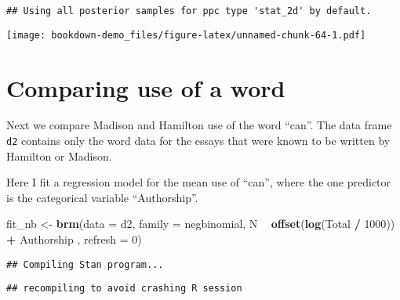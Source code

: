 \documentclass[
]{book}
\newenvironment{Shaded}{\begin{snugshade}}{\end{snugshade}}
\newcommand{\DataTypeTok}[1]{\textcolor[rgb]{0.13,0.29,0.53}{#1}}
\newcommand{\DecValTok}[1]{\textcolor[rgb]{0.00,0.00,0.81}{#1}}
\newcommand{\KeywordTok}[1]{\textcolor[rgb]{0.13,0.29,0.53}{\textbf{#1}}}
\newcommand{\NormalTok}[1]{#1}
\newcommand{\OperatorTok}[1]{\textcolor[rgb]{0.81,0.36,0.00}{\textbf{#1}}}
\newcommand{\StringTok}[1]{\textcolor[rgb]{0.31,0.60,0.02}{#1}}
\begin{document}
\begin{verbatim}
## Using all posterior samples for ppc type 'stat_2d' by default.
\end{verbatim}

\texttt{[image: bookdown-demo\_files/figure-latex/unnamed-chunk-64-1.pdf]}

\hypertarget{comparing-use-of-a-word}{%
\section{Comparing use of a word}\label{comparing-use-of-a-word}}

Next we compare Madison and Hamilton use of the word ``can''. The data frame \texttt{d2} contains only the word data for the essays that were known to be written by Hamilton or Madison.

\begin{Shaded}
\end{Shaded}

Here I fit a regression model for the mean use of ``can'', where the one predictor is the categorical variable ``Authorship''.

\begin{Shaded}
\begin{Highlighting}[]
\NormalTok{fit_nb <-}\StringTok{ }\KeywordTok{brm}\NormalTok{(}\DataTypeTok{data =}\NormalTok{ d2, }\DataTypeTok{family =}\NormalTok{ negbinomial,}
\NormalTok{           N }\OperatorTok{~}\StringTok{ }\KeywordTok{offset}\NormalTok{(}\KeywordTok{log}\NormalTok{(Total }\OperatorTok{/}\StringTok{ }\DecValTok{1000}\NormalTok{)) }\OperatorTok{+}\StringTok{ }
\StringTok{          }\NormalTok{Authorship ,}
           \DataTypeTok{refresh =} \DecValTok{0}\NormalTok{)}
\end{Highlighting}
\end{Shaded}

\begin{verbatim}
## Compiling Stan program...
\end{verbatim}

\begin{verbatim}
## recompiling to avoid crashing R session
\end{verbatim}
\end{document}
